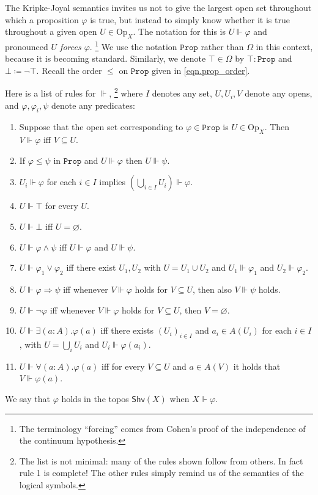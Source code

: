 \documentclass[11pt, oneside, article]{memoir}
\theoremstyle{plain}
\theoremstyle{definition}
\theoremstyle{remark}
\renewcommand{\ss}{\subseteq}
\newcommand{\const}[1]{\mathtt{#1}}
\newcommand{\Set}[1]{\mathrm{#1}}
\newcommand{\Fun}[1]{\mathsf{#1}}
\newcommand{\forces}{\Vdash}
\newcommand{\shv}{\Fun{Shv}}
\newcommand{\prop}{\const{Prop}}
\newcommand{\Op}{\Set{Op}}
\newcommand{\imp}{\Rightarrow}
\newcommand{\true}{\top}
\newcommand{\false}{\bot}
\begin{document}
The Kripke-Joyal semantics invites us not to give the largest open set throughout which a proposition $\varphi$ is true, but instead to simply know whether it is true throughout a given open $U\in\Op_X$. The notation for this is $U\forces\varphi$ and pronounced \emph{$U$ forces $\varphi$}.%
\footnote{The terminology ``forcing'' comes from Cohen's proof of the independence of the continuum hypothesis.}
We use the notation $\prop$ rather than $\Omega$ in this context, because it is becoming standard. Similarly, we denote $\top\in\Omega$ by $\true:\prop$ and $\false\coloneqq\neg\true$. Recall the order $\leq$ on $\prop$ given in \eqref{eqn.prop_order}.

Here is a list of rules for $\forces$,%
\footnote{The list is not minimal: many of the rules shown follow from others. In fact rule 1 is complete! The other rules simply remind us of the semantics of the logical symbols.
}
where $I$ denotes any set, $U, U_i, V$ denote any opens, and $\varphi,\varphi_i,\psi$ denote any predicates:
\begin{enumerate}
	\item Suppose that the open set corresponding to $\varphi\in\prop$ is $U\in\Op_X$. Then $V\forces\varphi$ iff $V\ss U$.
  \item If $\varphi\leq\psi$ in $\prop$ and $U\forces\varphi$ then $U\forces\psi$.
  \item $U_i\forces\varphi$ for each $i\in I$ implies $\left(\bigcup_{i\in I}U_i\right)\forces\varphi$.
  \item $U\forces\true$ for every $U$.
  \item $U\forces\false$ iff $U=\varnothing$.
  \item $U\forces\varphi\wedge\psi$ iff $U\forces\varphi$ and $U\forces\psi$.
  \item $U\forces\varphi_1\vee\varphi_2$ iff there exist $U_1,U_2$ with $U=U_1\cup U_2$ and $U_1\forces\varphi_1$ and $U_2\forces\varphi_2$.
  \item $U\forces \varphi\imp\psi$ iff whenever $V\forces\varphi$ holds for $V\ss U$, then also $V\forces\psi$ holds.
  \item $U\forces\neg\varphi$ iff whenever $V\forces\varphi$ holds for $V\ss U$, then $V=\varnothing$.
  \item $U\forces\exists (a:A).\varphi(a)$ iff there exists $(U_i)_{i\in I}$ and $a_i\in A(U_i)$ for each $i\in I$, with $U=\bigcup_iU_i$ and $U_i\forces\varphi(a_i)$.
  \item $U\forces\forall (a:A).\varphi(a)$ iff for every $V\ss U$ and $a\in A(V)$ it holds that $V\forces \varphi(a)$.
\end{enumerate}
We say that $\varphi$ holds in the topos $\shv(X)$ when $X\forces\varphi$.
\end{document}
